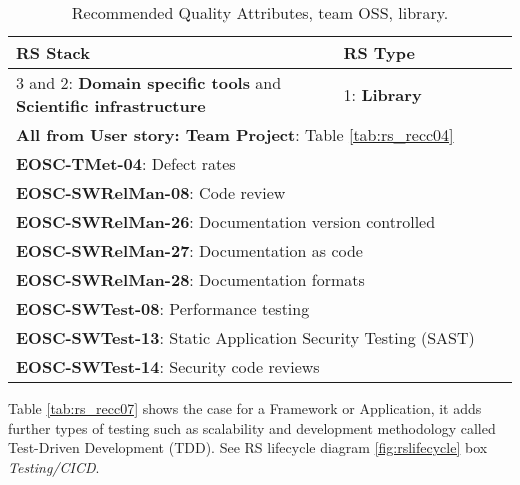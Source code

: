\begin{center}
\begin{table}[h]

  \small
  \begin{tabular}{|p{0.65\linewidth}|p{0.35\linewidth}|} \hline

    \textbf{RS Stack} & \textbf{RS Type} \\ \hline \hline
    3 and 2: \textbf{Domain specific tools} and  \textbf{Scientific infrastructure} &
    1: \textbf{Library} \\ \hline \hline
    \multicolumn{2}{|l|}{\textbf{All from User story: Team Project}: Table \ref{tab:rs_recc04}} \\ \hline
    \multicolumn{2}{|l|}{\textbf{EOSC-TMet-04}: Defect rates} \\ \hline
    \multicolumn{2}{|l|}{\textbf{EOSC-SWRelMan-08}: Code review} \\ \hline
    \multicolumn{2}{|l|}{\textbf{EOSC-SWRelMan-26}: Documentation version controlled} \\ \hline
    \multicolumn{2}{|l|}{\textbf{EOSC-SWRelMan-27}: Documentation as code} \\ \hline
    \multicolumn{2}{|l|}{\textbf{EOSC-SWRelMan-28}: Documentation formats} \\ \hline
    \multicolumn{2}{|l|}{\textbf{EOSC-SWTest-08}: Performance testing} \\ \hline
    \multicolumn{2}{|l|}{\textbf{EOSC-SWTest-13}: Static Application Security Testing (SAST)} \\ \hline
    \multicolumn{2}{|l|}{\textbf{EOSC-SWTest-14}: Security code reviews} \\ \hline

  \end{tabular}
  \caption{Recommended Quality Attributes, team OSS, library.}
  \label{tab:rs_recc06}
\end{table}
\end{center}

Table \ref{tab:rs_recc07} shows the case for a Framework or Application, it adds further types of testing such as scalability and development methodology called Test-Driven Development (TDD). See RS lifecycle diagram \ref{fig:rslifecycle} box \textit{Testing/CICD}.


